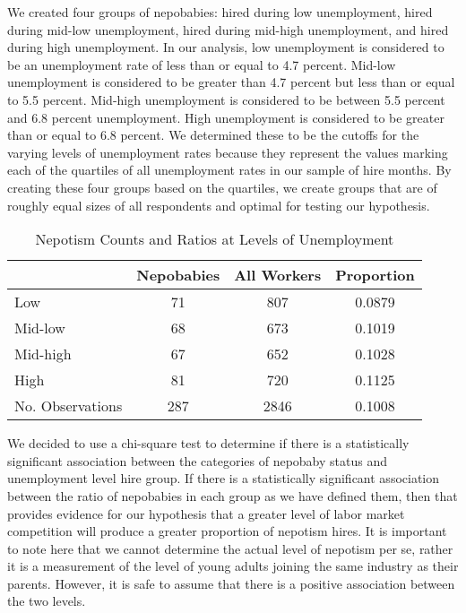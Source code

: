 \documentclass[12pt]{article}
\begin{document}
We created four groups of nepobabies: hired during low unemployment, hired during mid-low unemployment, hired during mid-high unemployment, and hired during high unemployment. In our analysis, low unemployment is considered to be an unemployment rate of less than or equal to 4.7 percent. Mid-low unemployment is considered to be greater than 4.7 percent but less than or equal to 5.5 percent. Mid-high unemployment is considered to be between 5.5 percent and 6.8 percent unemployment. High unemployment is considered to be greater than or equal to 6.8 percent. We determined these to be the cutoffs for the varying levels of unemployment rates because they represent the values marking each of the quartiles of all unemployment rates in our sample of hire months. By creating these four groups based on the quartiles, we create groups that are of roughly equal sizes of all respondents and optimal for testing our hypothesis.

\begin{table}[ht]
\centering
\begin{tabular}{l|cc|c}
 & Nepobabies & All Workers & Proportion \\ 
\hline 
Low & 71 & 807 & 0.0879 \\
Mid-low & 68 & 673 & 0.1019 \\
Mid-high & 67 & 652 & 0.1028 \\
High & 81 & 720 & 0.1125 \\
\hline 
No. Observations & 287 & 2846 & 0.1008 \\
\end{tabular}
\caption{Nepotism Counts and Ratios at Levels of Unemployment}
\label{tab:mytable}
\end{table}

We decided to use a chi-square test to determine if there is a statistically significant association between the categories of nepobaby status and unemployment level hire group. If there is a statistically significant association between the ratio of nepobabies in each group as we have defined them, then that provides evidence for our hypothesis that a greater level of labor market competition will produce a greater proportion of nepotism hires. It is important to note here that we cannot determine the actual level of nepotism per se, rather it is a measurement of the level of young adults joining the same industry as their parents. However, it is safe to assume that there is a positive association between the two levels.
\end{document}
